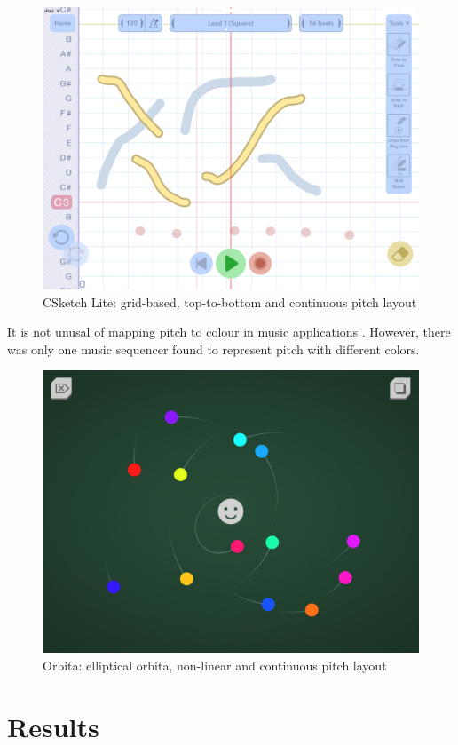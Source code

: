 \begin{figure}
  \includegraphics[width=12 cm]{images/CSketch_Lite.PNG}
  \centering
  \caption{CSketch Lite: grid-based, top-to-bottom and continuous pitch layout}
  \label{fig: CSketch}
\end{figure}

It is not unusal of mapping pitch to colour in music applications \citep{Reference14}. However, there was only one music sequencer found to represent pitch with different colors.  

\newpage
\bigskip
\begin{figure}
  \includegraphics[width=12 cm]{images/Orbita.PNG}
  \centering
  \caption{Orbita: elliptical orbita, non-linear and continuous pitch layout}
  \label{fig: Orbita}
\end{figure}
\bigskip

\section{Results}
\label{sec: result}
